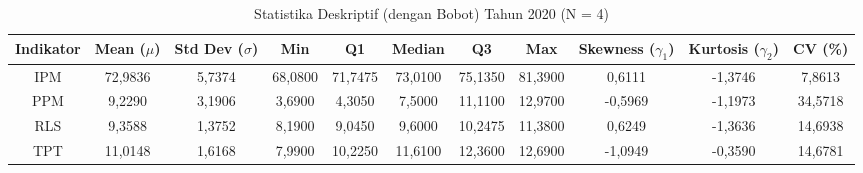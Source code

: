 \begin{table}[H]
\centering
\caption{Statistika Deskriptif (dengan Bobot) Tahun 2020 (N = 4)} \label{tab:sample1desc_2020}
\begin{adjustbox}{max width=\textwidth, max height=0.85\textheight}
\begin{tabular}{|c|c|c|c|c|c|c|c|c|c|c|}
\hline
\textbf{Indikator} & \textbf{Mean ($\mu$)} & \textbf{Std Dev ($\sigma$)} & \textbf{Min} & \textbf{Q1} & \textbf{Median} & \textbf{Q3} & \textbf{Max} & \textbf{Skewness ($\gamma_1$)} & \textbf{Kurtosis ($\gamma_2$)} & \textbf{CV (\%)} \\
\hline
IPM & 72,9836 & 5,7374 & 68,0800 & 71,7475 & 73,0100 & 75,1350 & 81,3900 & 0,6111 & -1,3746 & 7,8613 \\
PPM & 9,2290 & 3,1906 & 3,6900 & 4,3050 & 7,5000 & 11,1100 & 12,9700 & -0,5969 & -1,1973 & 34,5718 \\
RLS & 9,3588 & 1,3752 & 8,1900 & 9,0450 & 9,6000 & 10,2475 & 11,3800 & 0,6249 & -1,3636 & 14,6938 \\
TPT & 11,0148 & 1,6168 & 7,9900 & 10,2250 & 11,6100 & 12,3600 & 12,6900 & -1,0949 & -0,3590 & 14,6781 \\
\hline
\end{tabular}
\end{adjustbox}
\end{table}